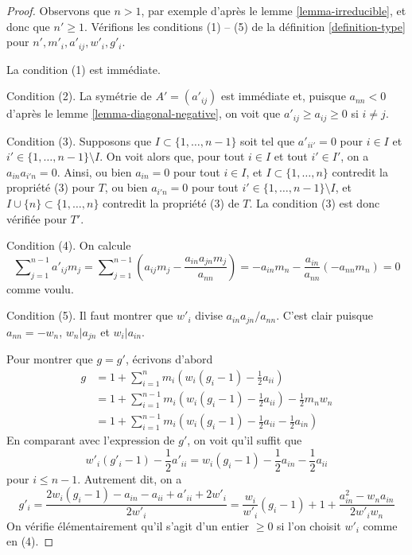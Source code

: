 \begin{proof}
Observons que $n > 1$, par exemple d'après le lemme \ref{lemma-irreducible},
et donc que $n' \geq 1$. Vérifions les conditions (1) -- (5) de la
définition \ref{definition-type} pour $n', m'_i, a'_{ij}, w'_i, g'_i$.

\medskip\noindent
La condition (1) est immédiate.

\medskip\noindent
Condition (2). La symétrie de $A' = (a'_{ij})$ est immédiate
et, puisque $a_{nn} < 0$ d'après le lemme \ref{lemma-diagonal-negative},
on voit que $a'_{ij} \geq a_{ij} \geq 0$ si $i \not = j$.

\medskip\noindent
Condition (3). Supposons que $I \subset \{1, \ldots, n - 1\}$ soit tel que
$a'_{ii'} = 0$ pour $i \in I$ et $i' \in \{1, \ldots, n - 1\} \setminus I$.
On voit alors que, pour tout $i \in I$ et tout $i' \in I'$, on a
$a_{in}a_{i'n} = 0$. Ainsi, ou bien $a_{in} = 0$ pour tout $i \in I$, et
$I \subset \{1, \ldots, n\}$ contredit la propriété (3) pour $T$,
ou bien $a_{i'n} = 0$ pour tout $i' \in \{1, \ldots, n - 1\} \setminus I$,
et $I \cup \{n\} \subset \{1, \ldots, n\}$ contredit
la propriété (3) de $T$. La condition (3) est donc vérifiée pour $T'$.

\medskip\noindent
Condition (4). On calcule
$$
\sum\nolimits_{j = 1}^{n - 1} a'_{ij}m_j =
\sum\nolimits_{j = 1}^{n - 1}
(a_{ij}m_j - \frac{a_{in}a_{jn}m_j}{a_{nn}}) =
- a_{in}m_n - \frac{a_{in}}{a_{nn}}(-a_{nn}m_n) = 0
$$
comme voulu.

\medskip\noindent
Condition (5). Il faut montrer que $w'_i$ divise $a_{in}a_{jn}/a_{nn}$.
C'est clair puisque $a_{nn} = -w_n$, $w_n | a_{jn}$ et $w_i | a_{in}$.

\medskip\noindent
Pour montrer que $g = g'$, écrivons d'abord
\begin{align*}
g
& =
1 + \sum\nolimits_{i = 1}^n m_i(w_i(g_i - 1) - \frac{1}{2}a_{ii}) \\
& =
1 + \sum\nolimits_{i = 1}^{n - 1} m_i(w_i(g_i - 1) - \frac{1}{2}a_{ii})
-\frac{1}{2}m_nw_n \\
& =
1 +  \sum\nolimits_{i = 1}^{n - 1}
m_i(w_i(g_i - 1) - \frac{1}{2}a_{ii} - \frac{1}{2}a_{in})
\end{align*}
En comparant avec l'expression de $g'$, on voit qu'il suffit que
$$
w'_i(g'_i - 1) - \frac{1}{2}a'_{ii} =
w_i(g_i - 1) - \frac{1}{2}a_{in} - \frac{1}{2}a_{ii}
$$
pour $i \leq n - 1$. Autrement dit, on a
$$
g'_i = \frac{2w_i(g_i - 1) - a_{in} - a_{ii} + a'_{ii} + 2w'_i}{2w'_i} =
\frac{w_i}{w'_i}(g_i - 1) + 1 + \frac{a_{in}^2 - w_na_{in}}{2w'_iw_n}
$$
On vérifie élémentairement qu'il s'agit d'un entier $\geq 0$
si l'on choisit $w'_i$ comme en (4).
\end{proof}

